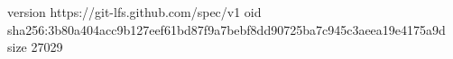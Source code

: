 version https://git-lfs.github.com/spec/v1
oid sha256:3b80a404acc9b127eef61bd87f9a7bebf8dd90725ba7c945c3aeea19e4175a9d
size 27029
